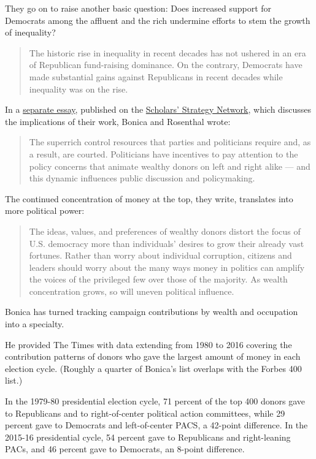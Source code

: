 They go on to raise another basic question: Does increased support for
Democrats among the affluent and the rich undermine efforts to stem the
growth of inequality?

\begin{quote}
The historic rise in inequality in recent decades has not ushered in an
era of Republican fund-raising dominance. On the contrary, Democrats
have made substantial gains against Republicans in recent decades while
inequality was on the rise.
\end{quote}

In a
\href{https://scholars.org/contribution/rising-economic-inequality-and-campaign-contributions-very-wealthy-americans}{separate
essay}, published on the \href{https://scholars.org/}{Scholars' Strategy
Network}, which discusses the implications of their work, Bonica and
Rosenthal wrote:

\begin{quote}
The superrich control resources that parties and politicians require
and, as a result, are courted. Politicians have incentives to pay
attention to the policy concerns that animate wealthy donors on left and
right alike --- and this dynamic influences public discussion and
policymaking.
\end{quote}

The continued concentration of money at the top, they write, translates
into more political power:

\begin{quote}
The ideas, values, and preferences of wealthy donors distort the focus
of U.S. democracy more than individuals' desires to grow their already
vast fortunes. Rather than worry about individual corruption, citizens
and leaders should worry about the many ways money in politics can
amplify the voices of the privileged few over those of the majority. As
wealth concentration grows, so will uneven political influence.
\end{quote}

Bonica has turned tracking campaign contributions by wealth and
occupation into a specialty.

He provided The Times with data extending from 1980 to 2016 covering the
contribution patterns of donors who gave the largest amount of money in
each election cycle. (Roughly a quarter of Bonica's list overlaps with
the Forbes 400 list.)

In the 1979-80 presidential election cycle, 71 percent of the top 400
donors gave to Republicans and to right-of-center political action
committees, while 29 percent gave to Democrats and left-of-center PACS,
a 42-point difference. In the 2015-16 presidential cycle, 54 percent
gave to Republicans and right-leaning PACs, and 46 percent gave to
Democrats, an 8-point difference.

